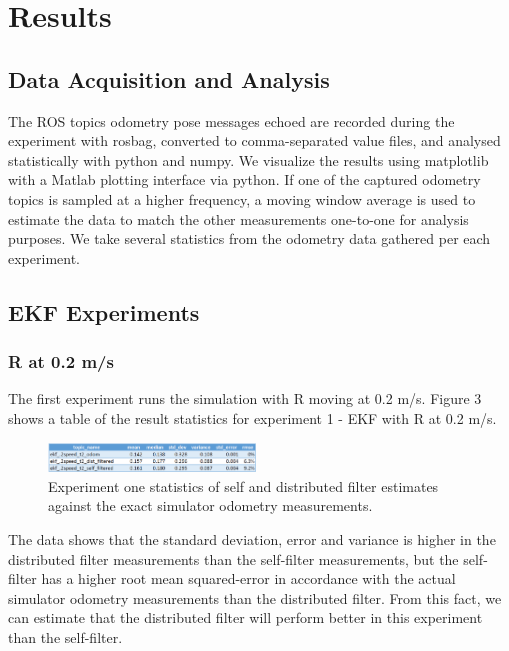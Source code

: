 \documentclass[conference]{IEEEtran} \usepackage[T1]{fontenc} \usepackage[backend=biber, style=ieee]{biblatex}
\begin{document}
\section{Results} \label{Results} %
\subsection{Data Acquisition and Analysis} \label{Data Acquisition and Analysis}
The ROS topics odometry pose messages echoed are 
recorded during the experiment with rosbag, converted to comma-separated value files, and analysed statistically with 
python and numpy. We visualize the results using matplotlib with a Matlab plotting interface via python. If one of the 
captured odometry topics is sampled at a higher frequency, a moving window average is used to estimate the data to match 
the other measurements one-to-one for analysis purposes. We take several statistics from the odometry data gathered per each experiment. 

\subsection{EKF Experiments} \label{EKF Experiments}
\subsubsection{R at 0.2 m/s} \label{EKF .2}
The first experiment runs the simulation with R moving at 0.2 m/s. Figure 3 shows a table of the result statistics for experiment 1 - EKF 
with R at 0.2 m/s. 

\begin{figure}[!ht]
\label{pic3} 
\centering 
\includegraphics[width=0.49\textwidth]{ekf_2_table}
\caption{Experiment one statistics of self and distributed filter estimates against the exact simulator odometry measurements.} 
\end{figure}

The data shows that the standard deviation, error and variance is higher in the distributed filter measurements than the 
self-filter measurements, but the self-filter has a higher root mean squared-error in accordance with the actual simulator odometry measurements than the distributed filter. From this fact, we can estimate that the distributed filter will perform better in this experiment than the self-filter. 
\end{document}
